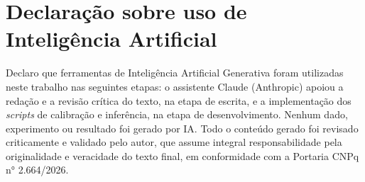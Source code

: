 \documentclass[10pt,conference]{IEEEtran}
\begin{document}
\section*{Declaração sobre uso de Inteligência Artificial}

Declaro que ferramentas de Inteligência Artificial Generativa foram utilizadas neste trabalho nas seguintes etapas: o assistente Claude (Anthropic) apoiou a redação e a revisão crítica do texto, na etapa de escrita, e a implementação dos \textit{scripts} de calibração e inferência, na etapa de desenvolvimento. Nenhum dado, experimento ou resultado foi gerado por IA. Todo o conteúdo gerado foi revisado criticamente e validado pelo autor, que assume integral responsabilidade pela originalidade e veracidade do texto final, em conformidade com a Portaria CNPq n° 2.664/2026.



\end{document}
